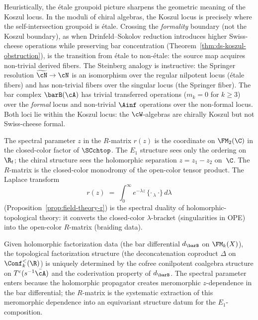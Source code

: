 \begin{remark}
\label{rem:etale-dichotomy}
Heuristically, the étale groupoid picture sharpens the geometric
meaning of the
Koszul locus. In the moduli of chiral algebras, the Koszul locus
is precisely where the self-intersection groupoid is étale.
Crossing the \emph{formality} boundary (not the Koszul boundary),
as when Drinfeld--Sokolov reduction introduces higher Swiss-cheese
operations while preserving bar concentration
(Theorem~\ref{thm:ds-koszul-obstruction}), is the transition from
étale to non-étale: the source map acquires non-trivial derived
fibers. The Steinberg analogy is instructive: the Springer
resolution $\widetilde{\cN} \to \cN$ is an isomorphism over the
regular nilpotent locus (étale fibers) and has non-trivial fibers
over the singular locus (the Springer fiber). The bar complex
$\barB(\cA)$ has trivial transferred operations ($m_k = 0$ for
$k \ge 3$) over the \emph{formal} locus and non-trivial $\Ainf$
operations over the non-formal locus. Both loci lie within the
Koszul locus: the $\cW$-algebras are chirally Koszul but not
Swiss-cheese formal.
\end{remark}

\begin{remark}
\label{rem:spectral-parameter-operadic}
The spectral parameter $z$ in the $R$-matrix $r(z)$ is the
coordinate on $\FM_2(\C)$ in the closed-color factor of
$\SCchtop$. The $E_1$ structure sees only the ordering on
$\R_t$; the chiral structure sees the holomorphic separation
$z = z_1 - z_2$ on~$\C$. The $R$-matrix is the closed-color
monodromy of the open-color tensor product. The Laplace
transform
\[
r(z)
\;=\;
\int_0^\infty e^{-\lambda z}\,
\{\cdot\,{}_\lambda\,\cdot\}\, d\lambda
\]
(Proposition~\ref{prop:field-theory-r}) is the spectral duality
of holomorphic-topological theory: it converts the closed-color
$\lambda$-bracket (singularities in OPE) into the open-color
$R$-matrix (braiding data).
\end{remark}

\begin{proposition}
\label{prop:two-color-canonicity}
Given holomorphic factorization data (the bar differential
$d_{\barB}$ on $\FM_k(X)$), the topological factorization
structure (the deconcatenation coproduct $\Delta$ on
$\Conf_k^{<}(\R)$) is uniquely determined by the cofree
conilpotent coalgebra structure on $T^c(s^{-1}\bar{\cA})$
and the coderivation property of $d_{\barB}$. The spectral parameter enters
because the holomorphic propagator creates meromorphic
$z$-dependence in the bar differential; the $R$-matrix is
the systematic extraction of this meromorphic dependence into
an equivariant structure datum for the $E_1$-composition.
\end{proposition}

